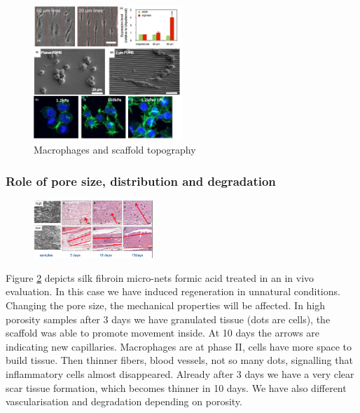 		\begin{figure}[ht]
			\centering
			\includegraphics[width=0.5\textwidth]{topo}
			\caption{Macrophages and scaffold topography\label{fig:topo}}
		\end{figure}

		\subsubsection{Role of pore size, distribution and degradation}

		\begin{figure}[ht]
			\centering
			\includegraphics[width=0.4\textwidth]{silk}
			\caption{\label{fig:silk}}
		\end{figure}

		Figure \ref{fig:silk} depicts silk fibroin micro-nets formic acid treated in an in vivo evaluation.
		In this case we have induced regeneration in unnatural conditions.
		Changing the pore size, the mechanical properties will be affected.
		In high porosity samples after 3 days we have granulated tissue (dots are cells), the scaffold was able to promote movement inside.
		At 10 days the arrows are indicating new capillaries.
		Macrophages are at phase II, cells have more space to build tissue.
		Then thinner fibers, blood vessels, not so many dots, signalling that inflammatory cells almost disappeared.
		Already after 3 days we have a very clear scar tissue formation, which becomes thinner in 10 days.
		We have also different vascularisation and degradation depending on porosity.

